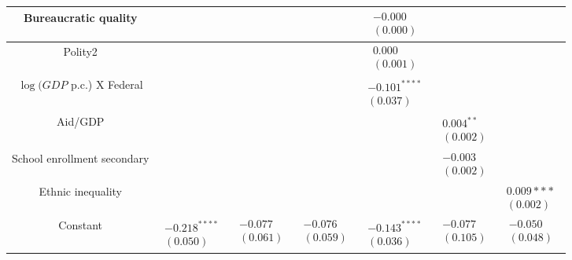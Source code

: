 \documentclass[10pt]{article}
\begin{document}
\begin{center}
\begin{tabular}{|c|c|c|c|c|c|c|}
\hline
Bureaucratic quality &  &  &  & $\begin{array}{l}-0.000 \\ (0.000)\end{array}$ &  &  \\
\hline
Polity2 &  &  &  & $\begin{array}{l}0.000 \\ (0.001)\end{array}$ &  &  \\
\hline
$\log (G D P$ p.c.) X Federal &  &  &  & $\begin{array}{l}-0.101^{* * * *} \\ (0.037)\end{array}$ &  &  \\
\hline
Aid/GDP &  &  &  &  & $\begin{array}{l}0.004^{* *} \\ (0.002)\end{array}$ &  \\
\hline
School enrollment secondary &  &  &  &  & $\begin{array}{l}-0.003 \\ (0.002)\end{array}$ &  \\
\hline
Ethnic inequality &  &  &  &  &  & $\begin{array}{l}0.009 * * * \\ (0.002)\end{array}$ \\
\hline
Constant & $\begin{array}{l}-0.218^{* * * *} \\ (0.050)\end{array}$ & $\begin{array}{l}-0.077 \\ (0.061)\end{array}$ & $\begin{array}{l}-0.076 \\ (0.059)\end{array}$ & $\begin{array}{l}-0.143^{* * * *} \\ (0.036)\end{array}$ & $\begin{array}{l}-0.077 \\ (0.105)\end{array}$ & $\begin{array}{l}-0.050 \\ (0.048)\end{array}$ \\

\end{tabular}
\end{center}
\end{document}
